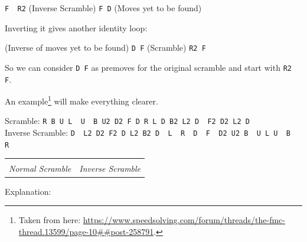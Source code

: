 \documentclass[11pt,a4paper]{book}
\newcommand{\p}{\textquotesingle}
\newcommand{\m}{\texttt}
\newcommand{\ps}{\p\,\,}
\begin{document}
\begin{center}
\m{F\ps R2} (Inverse Scramble) \m{F D\p} (Moves yet to be found)
\end{center}

Inverting it gives another identity loop:

\begin{center}
(Inverse of moves yet to be found) \m{D F\p} (Scramble) \m{R2 F}
\end{center}

So we can consider \m{D F\p} as premoves for the original scramble and start with \m{R2 F}.

An example\footnote{Taken from here: \url{https://www.speedsolving.com/forum/threads/the-fmc-thread.13599/page-10##post-258791}.} will make everything clearer.

\begin{center}
Scramble: \m{R B U L\ps U\ps B U2 D2 F D R L D B2 L2 D\ps F2 D2 L2 D}\\
Inverse Scramble: \m{D\ps L2 D2 F2 D L2 B2 D\ps L\ps R\ps D\ps F\ps D2 U2 B\ps U L U\ps B\ps R\ps}\\
\begin{tabular}{cc}
 & \\
\emph{Normal Scramble} & \emph{Inverse Scramble} 
\end{tabular}
\end{center}

Explanation:
\end{document}
